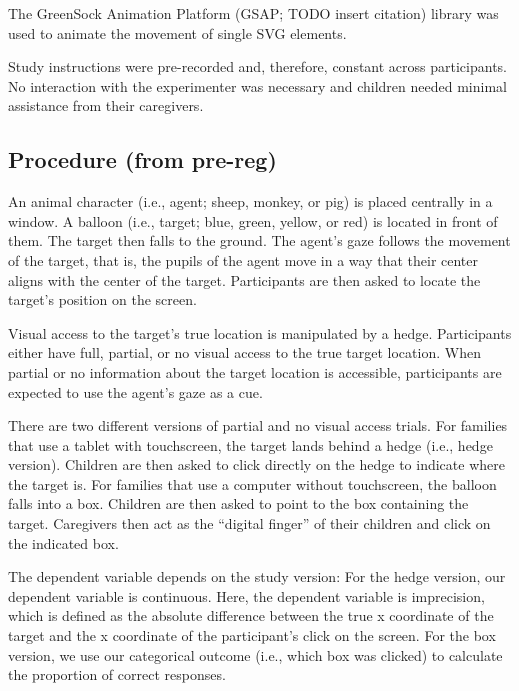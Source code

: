 \documentclass[
  english,
  man,floatsintext]{apa6}
\begin{document}
The GreenSock Animation Platform (GSAP; TODO insert citation) library was used
to animate the movement of single SVG elements.

Study instructions were pre-recorded and, therefore, constant across participants.
No interaction with the experimenter was necessary and children needed minimal assistance from their caregivers.

\hypertarget{procedure-from-pre-reg}{%
\subsection{Procedure (from pre-reg)}\label{procedure-from-pre-reg}}

An animal character (i.e., agent; sheep, monkey, or pig) is placed centrally in a window.
A balloon (i.e., target; blue, green, yellow, or red) is located in front of them.
The target then falls to the ground.
The agent's gaze follows the movement of the target,
that is, the pupils of the agent move in a way that their center aligns with the center of the target.
Participants are then asked to locate the target's position on the screen.

Visual access to the target's true location is manipulated by a hedge.
Participants either have full, partial, or no visual access to the true target location.
When partial or no information about the target location is accessible,
participants are expected to use the agent's gaze as a cue.

There are two different versions of partial and no visual access trials.
For families that use a tablet with touchscreen,
the target lands behind a hedge (i.e., hedge version).
Children are then asked to click directly on the hedge to indicate where the target is.
For families that use a computer without touchscreen, the balloon falls into a box.
Children are then asked to point to the box containing the target.
Caregivers then act as the ``digital finger'' of their children and click on the indicated box.

The dependent variable depends on the study version:
For the hedge version, our dependent variable is continuous.
Here, the dependent variable is imprecision,
which is defined as the absolute difference between the true x coordinate of the target
and the x coordinate of the participant's click on the screen.
For the box version, we use our categorical outcome (i.e., which box was clicked)
to calculate the proportion of correct responses.
\end{document}
